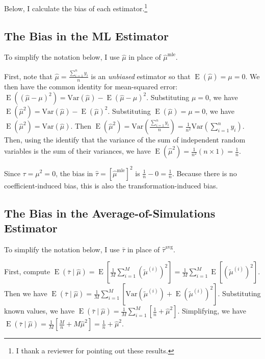 \documentclass[12pt]{article}
\DeclareMathOperator*{\E}{\text{E}}
\begin{document}
Below, I calculate the bias of each estimator.\footnote{I thank a reviewer for pointing out these results.}

\subsection{The Bias in the ML Estimator}

To simplify the notation below, I use $\hat{\mu}$ in place of $\hat{\mu}^\text{mle}$.

First, note that $\hat{\mu}= \frac{\sum_{i=1}^n y_i}{n}$ is an \textit{unbiased} estimator so that $\E(\hat{\mu}) = \mu = 0$. We then have the common identity for mean-squared error: $\E\left( (\hat{\mu} - \mu)^2 \right) = \text{Var}\left(\hat{\mu}\right) - \E(\hat{\mu} - \mu)^2$. Substituting $\mu = 0$, we have $\E\left( \hat{\mu}^2 \right) = \text{Var}\left(\hat{\mu}\right) - \E(\hat{\mu})^2$. Substituting $\E(\hat{\mu}) = \mu = 0$, we have $\E\left( \hat{\mu}^2 \right) = \text{Var}\left(\hat{\mu}\right)$. Then $\E\left( \hat{\mu}^2 \right) = \text{Var}\left( \frac{\sum_{i=1}^n y_i}{n} \right) = \frac{1}{n^2} \text{Var}\left(\sum_{i=1}^n y_i \right)$. Then, using the identify that the variance of the sum of independent random variables is the sum of their variances, we have  $\E\left( \hat{\mu}^2 \right) = \frac{1}{n^2}  (n \times 1) = \frac{1}{n}$.

Since $\tau = \mu^2 = 0$, the bias in $\hat{\tau} = \left[ \hat{\mu}^\text{mle} \right]^2$ is $\frac{1}{n} - 0 = \frac{1}{n}$. Because there is no coefficient-induced bias, this is also the transformation-induced bias.

\subsection{The Bias in the Average-of-Simulations Estimator}

To simplify the notation below, I use $\bar{\tau}$ in place of $\hat{\tau}^\text{avg}$.

First, compute $\E(\bar{\tau} \mid \hat{\mu}) = \E\left[  \frac{1}{M} \sum_{i = 1}^M \left( \tilde{\mu}^{(i)} \right)^2 \right] = \frac{1}{M}  \sum_{i = 1}^M  \E\left[ \left( \tilde{\mu}^{(i)} \right)^2 \right]$. Then we have $\E(\bar{\tau} \mid \hat{\mu}) = \frac{1}{M}  \sum_{i = 1}^M \left[ \text{Var}(\tilde{\mu}^{(i)}) + \E\left( \tilde{\mu}^{(i)}\right)^2 \right]$. Substituting known values, we have $\E(\bar{\tau} \mid \hat{\mu}) = \frac{1}{M}  \sum_{i = 1}^M \left[ \frac{1}{n} + \hat{\mu}^2 \right]$. Simplifying, we have $\E(\bar{\tau} \mid \hat{\mu}) = \frac{1}{M}  \left[ \frac{M}{n} + M\hat{\mu}^2 \right] = \frac{1}{n} + \hat{\mu}^2$.
\end{document}
